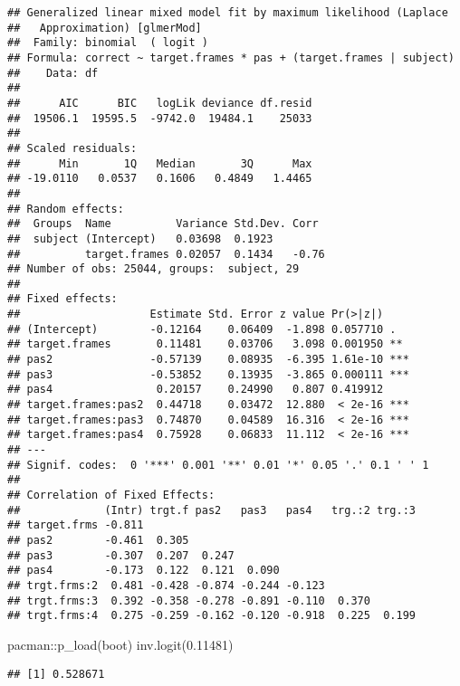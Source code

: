 \documentclass[
]{article}
\newenvironment{Shaded}{\begin{snugshade}}{\end{snugshade}}
\newcommand{\FloatTok}[1]{\textcolor[rgb]{0.00,0.00,0.81}{#1}}
\newcommand{\FunctionTok}[1]{\textcolor[rgb]{0.00,0.00,0.00}{#1}}
\newcommand{\NormalTok}[1]{#1}
\newcommand{\SpecialCharTok}[1]{\textcolor[rgb]{0.00,0.00,0.00}{#1}}
\begin{document}
\begin{verbatim}
## Generalized linear mixed model fit by maximum likelihood (Laplace
##   Approximation) [glmerMod]
##  Family: binomial  ( logit )
## Formula: correct ~ target.frames * pas + (target.frames | subject)
##    Data: df
## 
##      AIC      BIC   logLik deviance df.resid 
##  19506.1  19595.5  -9742.0  19484.1    25033 
## 
## Scaled residuals: 
##      Min       1Q   Median       3Q      Max 
## -19.0110   0.0537   0.1606   0.4849   1.4465 
## 
## Random effects:
##  Groups  Name          Variance Std.Dev. Corr 
##  subject (Intercept)   0.03698  0.1923        
##          target.frames 0.02057  0.1434   -0.76
## Number of obs: 25044, groups:  subject, 29
## 
## Fixed effects:
##                    Estimate Std. Error z value Pr(>|z|)    
## (Intercept)        -0.12164    0.06409  -1.898 0.057710 .  
## target.frames       0.11481    0.03706   3.098 0.001950 ** 
## pas2               -0.57139    0.08935  -6.395 1.61e-10 ***
## pas3               -0.53852    0.13935  -3.865 0.000111 ***
## pas4                0.20157    0.24990   0.807 0.419912    
## target.frames:pas2  0.44718    0.03472  12.880  < 2e-16 ***
## target.frames:pas3  0.74870    0.04589  16.316  < 2e-16 ***
## target.frames:pas4  0.75928    0.06833  11.112  < 2e-16 ***
## ---
## Signif. codes:  0 '***' 0.001 '**' 0.01 '*' 0.05 '.' 0.1 ' ' 1
## 
## Correlation of Fixed Effects:
##             (Intr) trgt.f pas2   pas3   pas4   trg.:2 trg.:3
## target.frms -0.811                                          
## pas2        -0.461  0.305                                   
## pas3        -0.307  0.207  0.247                            
## pas4        -0.173  0.122  0.121  0.090                     
## trgt.frms:2  0.481 -0.428 -0.874 -0.244 -0.123              
## trgt.frms:3  0.392 -0.358 -0.278 -0.891 -0.110  0.370       
## trgt.frms:4  0.275 -0.259 -0.162 -0.120 -0.918  0.225  0.199
\end{verbatim}

\begin{Shaded}
\begin{Highlighting}[]
\NormalTok{pacman}\SpecialCharTok{::}\FunctionTok{p\_load}\NormalTok{(boot)}
\FunctionTok{inv.logit}\NormalTok{(}\FloatTok{0.11481}\NormalTok{)}
\end{Highlighting}
\end{Shaded}

\begin{verbatim}
## [1] 0.528671
\end{verbatim}
\end{document}
